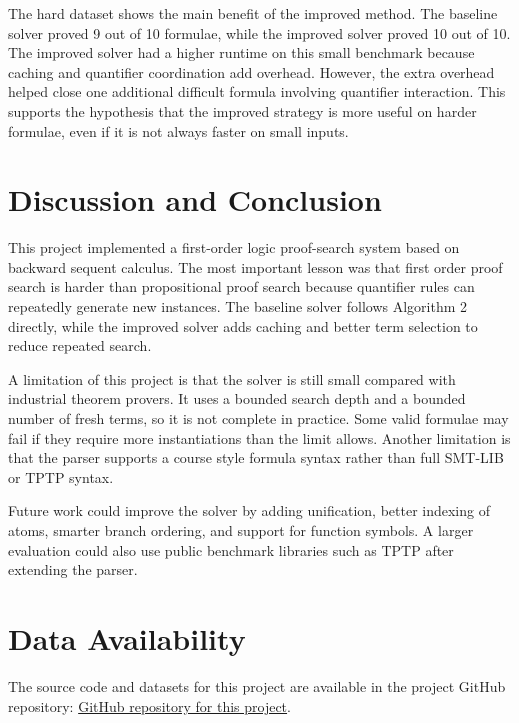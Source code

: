 \documentclass[runningheads]{llncs}
\begin{document}
The hard dataset shows the main benefit of the improved method. The baseline solver proved 9 out of 10 formulae, while the improved solver proved 10 out of 10. The improved solver had a higher runtime on this small benchmark because caching and quantifier coordination add overhead. However, the extra overhead helped close one additional difficult formula involving quantifier interaction. This supports the hypothesis that the improved strategy is more useful on harder formulae, even if it is not always faster on small inputs.

\section{Discussion and Conclusion}

This project implemented a first-order logic proof-search system based on backward sequent calculus. The most important lesson was that first order proof search is harder than propositional proof search because quantifier rules can repeatedly generate new instances. The baseline solver follows Algorithm 2 directly, while the improved solver adds caching and better term selection to reduce repeated search.

A limitation of this project is that the solver is still small compared with industrial theorem provers. It uses a bounded search depth and a bounded number of fresh terms, so it is not complete in practice. Some valid formulae may fail if they require more instantiations than the limit allows. Another limitation is that the parser supports a course style formula syntax rather than full SMT-LIB or TPTP syntax.

Future work could improve the solver by adding unification, better indexing of atoms, smarter branch ordering, and support for function symbols. A larger evaluation could also use public benchmark libraries such as TPTP after extending the parser.

\section{Data Availability}
The source code and datasets for this project are available in the project GitHub repository:
\href{https://github.com/Maxbatan/3806ICT_Assignment1Vigneshakamax}{GitHub repository for this project}.
\end{document}
